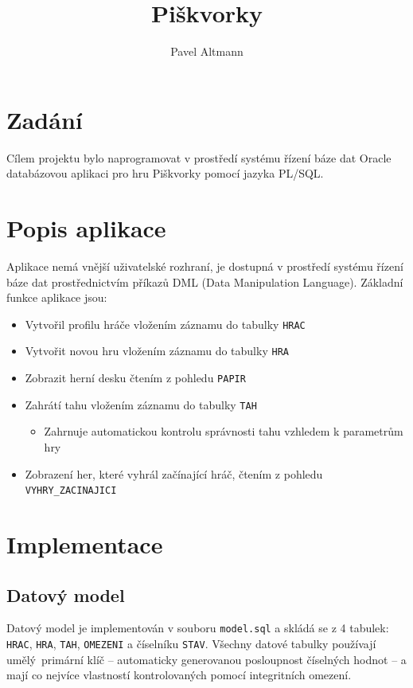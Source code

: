 \documentclass[11pt,a4paper,parskip=half-]{scrartcl}
\title{Piškvorky}
\author{Pavel Altmann}
\newcommand{\code}[1]{\texttt{#1}}
\begin{document}
\maketitle

\newpage
\tableofcontents
\newpage

\section{Zadání}

Cílem projektu bylo naprogramovat v prostředí systému řízení báze dat Oracle
databázovou aplikaci pro hru Piškvorky pomocí jazyka PL/SQL.

\section{Popis aplikace}

Aplikace nemá vnější uživatelské rozhraní, je dostupná v prostředí systému
řízení báze dat prostřednictvím příkazů DML (Data Manipulation Language).
Základní funkce aplikace jsou:

\begin{itemize}
  \item Vytvořil profilu hráče vložením záznamu do tabulky \code{HRAC}
  \item Vytvořit novou hru vložením záznamu do tabulky \code{HRA}
  \item Zobrazit herní desku čtením z pohledu \code{PAPIR}
  \item Zahrátí tahu vložením záznamu do tabulky \code{TAH}
    \begin{itemize}
      \item Zahrnuje automatickou kontrolu správnosti tahu vzhledem k
        parametrům hry
    \end{itemize}
  \item Zobrazení her, které vyhrál začínající hráč, čtením z pohledu
    \code{VYHRY\_ZACINAJICI}
\end{itemize}

\section{Implementace}

\subsection{Datový model}

Datový model je implementován v souboru \code{model.sql} a skládá se z 4
tabulek: \code{HRAC}, \code{HRA}, \code{TAH}, \code{OMEZENI} a číselníku
\code{STAV}. Všechny datové tabulky používají umělý primární klíč -- automaticky
generovanou posloupnost číselných hodnot -- a mají co nejvíce vlastností
kontrolovaných pomocí integritních omezení.
\end{document}
